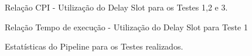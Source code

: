 \begin{figure}[H]
	\begin{center}
		\caption{Relação CPI - Utilização do Delay Slot para os Testes 1,2 e 3.}
		\label{cpi}
	\end{center}
\end{figure}

\begin{figure}[H]
	\begin{center}
		\caption{Relação Tempo de execução - Utilização do Delay Slot para Teste 1}
		\label{tempexet1}
	\end{center}
\end{figure}

\begin{figure}[H]
	\begin{center}
		\caption{Estatísticas do Pipeline para os Testes realizados.}
		\label{tabela}
	\end{center}
\end{figure}